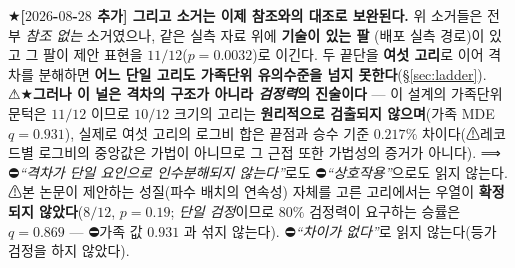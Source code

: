 \documentclass[11pt]{report}
\numberwithin{equation}{chapter}
\numberwithin{figure}{chapter}
\numberwithin{table}{chapter}
\begin{document}
★\textbf{[$2026$-$08$-$28$ 추가] 그리고 소거는 이제 참조와의 대조로 보완된다.} 위
소거들은 전부 \emph{참조 없는} 소거였으나, 같은 실측 자료 위에 \textbf{기술이 있는 팔}
(배포 실측 경로)이 있고 그 팔이 제안 표현을 $11/12$($p = 0.0032$)로 이긴다. 두 끝단을
\textbf{여섯 고리}로 이어 격차를 분해하면 \textbf{어느 단일 고리도 가족단위 유의수준을
넘지 못한다}(\S\ref{sec:ladder}).
⚠★\textbf{그러나 이 널은 격차의 구조가 아니라 \emph{검정력}의 진술이다} --- 이 설계의
가족단위 문턱은 \textbf{$11/12$} 이므로 $10/12$ 크기의 고리는 \textbf{원리적으로 검출되지
않으며}(가족 MDE $q = 0.931$), 실제로 여섯 고리의 로그비 합은 끝점과 승수 기준
\textbf{$0.217\%$} 차이다(⚠레코드별 로그비의 중앙값은 가법이 아니므로 그 근접 또한
가법성의 증거가 아니다). ⟹ ⛔\emph{``격차가 단일 요인으로 인수분해되지 않는다''}로도
⛔\emph{``상호작용''}으로도 읽지 않는다.
⚠본 논문이 제안하는 성질(파수 배치의 연속성) 자체를 고른 고리에서는 우열이
\textbf{확정되지 않았다}($8/12$, $p = 0.19$; \emph{단일 검정}이므로 $80\%$ 검정력이
요구하는 승률은 $q = 0.869$ --- ⛔가족 값 $0.931$ 과 섞지 않는다).
⛔\emph{``차이가 없다''}로 읽지 않는다(등가 검정을 하지 않았다).
\end{document}
